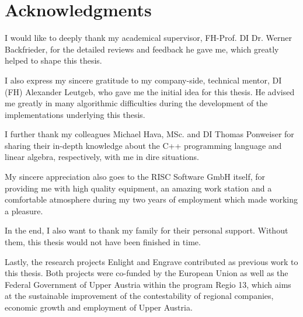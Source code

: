 
\chapter*{Acknowledgments}

I would like to deeply thank my academical supervisor, FH-Prof. DI Dr. Werner Backfrieder, for the detailed reviews and feedback he gave me, which greatly helped to shape this thesis.

I also express my sincere gratitude to my company-side, technical mentor, DI (FH) Alexander Leutgeb, who gave me the initial idea for this thesis.
He advised me greatly in many algorithmic difficulties during the development of the implementations underlying this thesis.

I further thank my colleagues Michael Hava, MSc. and DI Thomas Ponweiser for sharing their in-depth knowledge about the C++ programming language and linear algebra, respectively, with me in dire situations.

My sincere appreciation also goes to the RISC Software GmbH itself, for providing me with high quality equipment, an amazing work station and a comfortable atmosphere during my two years of employment which made working a pleasure.

In the end, I also want to thank my family for their personal support.
Without them, this thesis would not have been finished in time.

Lastly, the research projects Enlight and Engrave contributed as previous work to this thesis.
Both projects were co-funded by the European Union as well as the Federal Government of Upper Austria within the program Regio 13, which aims at the sustainable improvement of the contestability of regional companies, economic growth and employment of Upper Austria.

